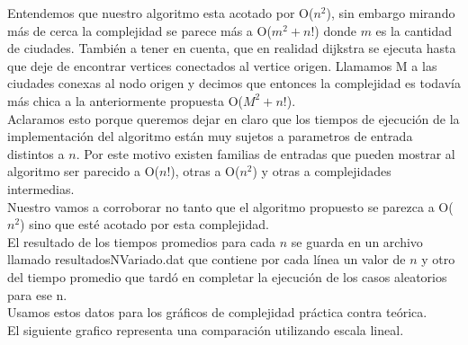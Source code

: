 \noindent 
Entendemos que nuestro algoritmo esta acotado por O($n^2$), sin embargo mirando m\'as de cerca la complejidad se parece m\'as a O($m^2+n!$) donde $m$ es la cantidad de ciudades. Tambi\'en a tener en cuenta, que en realidad dijkstra se ejecuta hasta que deje de encontrar vertices conectados al vertice origen. Llamamos M a las ciudades conexas al nodo origen y decimos que entonces la complejidad es todav\'ia m\'as chica a la anteriormente propuesta O($M^2+n!$). \\
Aclaramos esto porque queremos dejar en claro que los tiempos de ejecuci\'on de la implementaci\'on del algoritmo est\'an muy sujetos a parametros de entrada distintos a $n$. Por este motivo existen familias de entradas que pueden mostrar al algoritmo ser parecido a O($n!$), otras a O($n^2$) y otras a complejidades intermedias. \\

\noindent 
Nuestro vamos a corroborar no tanto que el algoritmo propuesto se parezca a O($n^2$) sino que est\'e acotado por esta complejidad. \\

\noindent 
El resultado de los tiempos promedios para cada $n$ se guarda en un archivo llamado resultadosNVariado.dat que contiene por cada l\'inea un valor de $n$ y otro del tiempo promedio que tard\'o en completar la ejecuci\'on de los casos aleatorios para ese n. \\

\noindent 
Usamos estos datos para los gr\'aficos de complejidad pr\'actica contra te\'orica.  \\
El siguiente grafico representa una comparación utilizando escala lineal. \\
